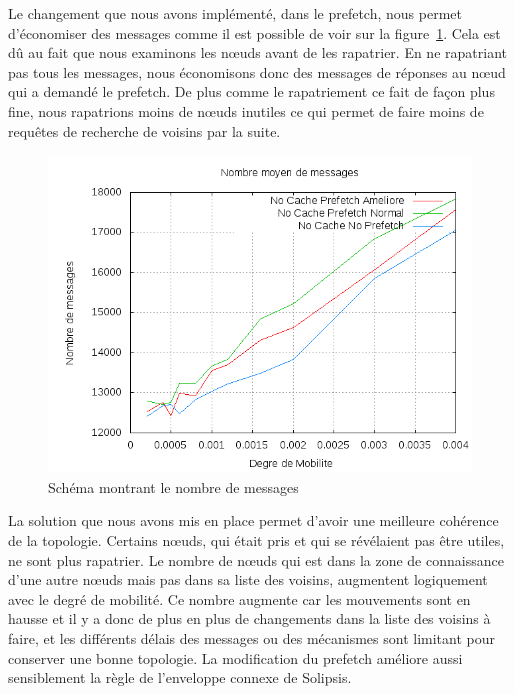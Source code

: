 \par Le changement que nous avons implémenté, dans le prefetch, nous permet d'économiser des messages comme il est possible de voir sur la figure~\ref{courbeNbMessPrefetch}. Cela est dû au fait que nous examinons les nœuds avant de les rapatrier. En ne rapatriant pas tous les messages, nous économisons donc des messages de réponses au nœud qui a demandé le prefetch. De plus comme le rapatriement ce fait de façon plus fine, nous rapatrions moins de nœuds inutiles ce qui permet de faire moins de requêtes de recherche de voisins par la suite.
	\begin{figure}[!h]
        \centering
        \includegraphics[scale=0.5]{../CacheCode/SolipsisPeersim/resultats/Courbes/Courbes_Final_Rapport/Nombre_Messages_Prefetchs.png}
        \caption{Schéma montrant le nombre de messages}
        \label{courbeNbMessPrefetch}
        \end{figure}

\par La solution que nous avons mis en place permet d'avoir une meilleure cohérence de la topologie. Certains nœuds, qui était pris et qui se révélaient pas être utiles, ne sont plus rapatrier. Le nombre de nœuds qui est dans la zone de connaissance d'une autre nœuds mais pas dans sa liste des voisins, augmentent logiquement avec le degré de mobilité. Ce nombre augmente car les mouvements sont en hausse et il y a donc de plus en plus de changements dans la liste des voisins à faire, et les différents délais des messages ou des mécanismes sont limitant pour conserver une bonne topologie. La modification du prefetch améliore aussi sensiblement la règle de l'enveloppe connexe de Solipsis.


